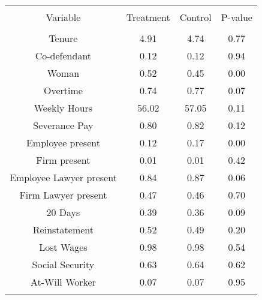 
\begin{table}[!htbp] \centering 
  \caption{} 
  \label{} 
\begin{tabular}{@{\extracolsep{5pt}} cccc} 
\\[-1.8ex]\hline 
\hline \\[-1.8ex] 
Variable & Treatment & Control & P-value \\ 
\hline \\[-1.8ex] 
Tenure &  4.91 &  4.74 & 0.77 \\ 
Co-defendant &  0.12 &  0.12 & 0.94 \\ 
Woman &  0.52 &  0.45 & 0.00 \\ 
Overtime &  0.74 &  0.77 & 0.07 \\ 
Weekly Hours & 56.02 & 57.05 & 0.11 \\ 
Severance Pay &  0.80 &  0.82 & 0.12 \\ 
Employee present &  0.12 &  0.17 & 0.00 \\ 
Firm present &  0.01 &  0.01 & 0.42 \\ 
Employee Lawyer present &  0.84 &  0.87 & 0.06 \\ 
Firm Lawyer present &  0.47 &  0.46 & 0.70 \\ 
20 Days &  0.39 &  0.36 & 0.09 \\ 
Reinstatement &  0.52 &  0.49 & 0.20 \\ 
Lost Wages &  0.98 &  0.98 & 0.54 \\ 
Social Security &  0.63 &  0.64 & 0.62 \\ 
At-Will Worker &  0.07 &  0.07 & 0.95 \\ 
\hline \\[-1.8ex] 
\end{tabular} 
\end{table} 
